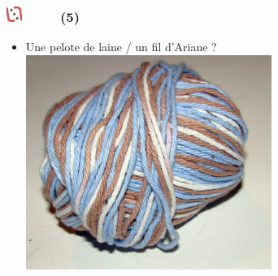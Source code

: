 \documentclass[slidetop,11pt]{beamer}
\def\moreInFrameTitleLeftt{\includegraphics[height=0.5cm]{img/ligueludique-0.png}~~~~~}
\begin{document}


\begin{frame}
	\frametitle{\moreInFrameTitleLeftt \sectionPartIIaIV  (5) }
	\begin{itemize}
		\item Une pelote de laine / un fil d'Ariane ?
		\includegraphics[height=7.00cm]{img/argTheLostRing/2299401072_b1ddc63acc_o.jpg}
	\end{itemize}
\end{frame}
\end{document}
